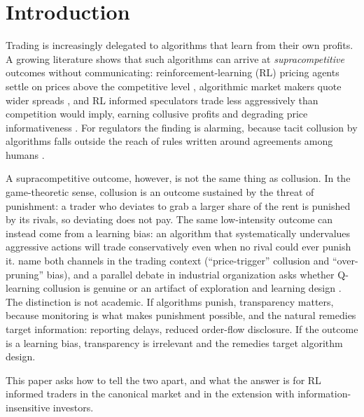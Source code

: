\section{Introduction}
\label{sec:intro}

Trading is increasingly delegated to algorithms that learn from their own
profits. A growing literature shows that such algorithms can arrive at
\emph{supracompetitive} outcomes without communicating: reinforcement-learning
(RL) pricing agents settle on prices above the competitive level
\citep{calvano2020,klein2021}, algorithmic market makers quote wider spreads
\citep{colliard2026,cont2024}, and RL informed speculators trade less
aggressively than competition would imply, earning collusive profits and
degrading price informativeness \citep{dou2025}. For regulators the finding is
alarming, because tacit collusion by algorithms falls outside the reach of
rules written around agreements among humans \citep{harrington2018,ezrachi2016}.

A supracompetitive outcome, however, is not the same thing as collusion. In the
game-theoretic sense, collusion is an outcome sustained by the threat of
punishment: a trader who deviates to grab a larger share of the rent is
punished by its rivals, so deviating does not pay. The same low-intensity
outcome can instead come from a learning bias: an algorithm that systematically
undervalues aggressive actions will trade conservatively even when no rival
could ever punish it. \citet{dou2025} name both channels in the trading context
(``price-trigger'' collusion and ``over-pruning'' bias), and a parallel debate
in industrial organization asks whether Q-learning collusion is genuine or an
artifact of exploration and learning design
\citep{calvano2023,abada2023,banchio2023,asker2022,denboer2026}. The
distinction is not academic. If algorithms punish, transparency matters,
because monitoring is what makes punishment possible, and the natural remedies
target information: reporting delays, reduced order-flow disclosure. If the
outcome is a learning bias, transparency is irrelevant and the remedies target
algorithm design.

This paper asks how to tell the two apart, and what the answer is for RL
informed traders in the canonical \citet{kyle1985} market and in the
\citet{dou2025} extension with information-insensitive investors.

